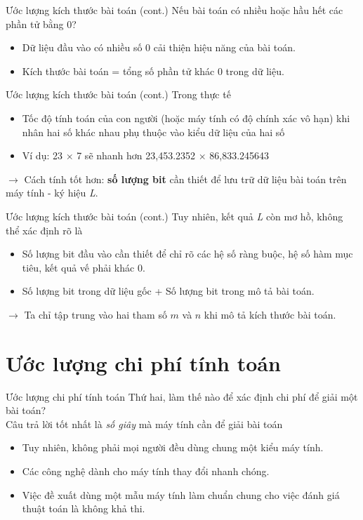 \documentclass[10pt]{beamer}
\begin{document}
\begin{frame}{Ước lượng kích thước bài toán (cont.)}
Nếu bài toán có nhiều hoặc hầu hết các phần tử bằng 0?
\begin{itemize}
\item Dữ liệu đầu vào có nhiều số 0 cải thiện hiệu năng của bài toán.
\item Kích thước bài toán = tổng số phần tử khác 0 trong dữ liệu.
\end{itemize}
\end{frame}

\begin{frame}{Ước lượng kích thước bài toán (cont.)}
Trong thực tế
\begin{itemize}
\item Tốc độ tính toán của con người (hoặc máy tính có độ chính xác vô hạn) khi nhân hai số khác nhau phụ thuộc vào kiểu dữ liệu của hai số
\item Ví dụ: 23 $\times$ 7 sẽ nhanh hơn 23,453.2352 $\times$ 86,833.245643
\end{itemize}
$\rightarrow$ Cách tính tốt hơn: \textbf{số lượng bit} cần thiết để lưu trữ dữ liệu bài toán trên máy tính - ký hiệu \textit{L}.
\end{frame}

\begin{frame}{Ước lượng kích thước bài toán (cont.)}
Tuy nhiên, kết quả \textit{L} còn mơ hồ, không thể xác định rõ là
\begin{itemize}
\item Số lượng bit đầu vào cần thiết để chỉ rõ các hệ số ràng buộc, hệ số hàm mục tiêu, kết quả vế phải khác 0.
\item Số lượng bit trong dữ liệu gốc + Số lượng bit trong mô tả bài toán.
\end{itemize}
$\rightarrow$ Ta chỉ tập trung vào hai tham số $m$ và $n$ khi mô tả kích thước bài toán.
\end{frame}


\section{Ước lượng chi phí tính toán}
\begin{frame}{Ước lượng chi phí tính toán}
Thứ hai, làm thế nào để xác định chi phí để giải một bài toán?\\
Câu trả lời tốt nhất là \textit{số giây} mà máy tính cần để giải bài toán
\begin{itemize}
\item Tuy nhiên, không phải mọi người đều dùng chung một kiểu máy tính.
\item Các công nghệ dành cho máy tính thay đổi nhanh chóng.
\item Việc đề xuất dùng một mẫu máy tính làm chuẩn chung cho việc đánh giá thuật toán là không khả thi.
\end{itemize}
\end{frame}
\end{document}
